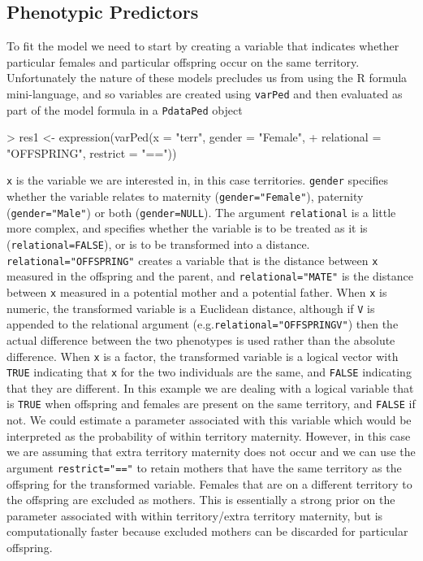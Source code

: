 \documentclass{article}
\begin{document}
\subsection{Phenotypic Predictors}
\label{pred-sec}

 To fit the model we need to start by creating a variable that indicates whether particular females and particular offspring occur on the same territory.  Unfortunately the nature of these models precludes us from using the R formula mini-language,  and so variables are created using \texttt{varPed} and then evaluated as part of the model formula in a \texttt{PdataPed} object

\begin{Schunk}
\begin{Sinput}
> res1 <- expression(varPed(x = "terr", gender = "Female", 
+     relational = "OFFSPRING",  restrict = "=="))
\end{Sinput}
\end{Schunk}

\texttt{x} is the variable we are interested in, in this case territories.  \texttt{gender} specifies whether the variable relates to maternity (\texttt{gender="Female"}), paternity (\texttt{gender="Male"}) or both (\texttt{gender=NULL}). The argument \texttt{relational} is a little more complex, and specifies whether the variable is to be treated as it is (\texttt{relational=FALSE}), or is to be transformed into a distance.  \texttt{relational="OFFSPRING"} creates a variable that is the distance between \texttt{x} measured in the offspring and the parent, and \texttt{relational="MATE"} is the distance between \texttt{x} measured in a potential mother and a potential father.  When \texttt{x} is numeric, the transformed variable is a Euclidean distance, although if \texttt{V} is appended to the relational argument (e.g.\texttt{relational="OFFSPRINGV"}) then the actual difference between the two phenotypes is used rather than the absolute difference. When \texttt{x} is a factor, the transformed variable is a logical vector with \texttt{TRUE} indicating that \texttt{x} for the two individuals are the same, and \texttt{FALSE} indicating that they are different.  In this example we are dealing with a logical variable that is \texttt{TRUE} when offspring and females are present on the same territory, and \texttt{FALSE} if not. We could estimate a parameter associated with this variable which would be interpreted as the probability of within territory maternity.  However, in this case we are assuming that extra territory maternity does not occur and we can use the argument \texttt{restrict="=="} to retain mothers that have the same territory as the offspring for the transformed variable. Females that are on a different territory to the offspring are excluded as mothers. This is essentially a strong prior on the parameter associated with within territory/extra territory maternity, but is computationally faster because excluded mothers can be discarded for particular offspring.\\
\end{document}
